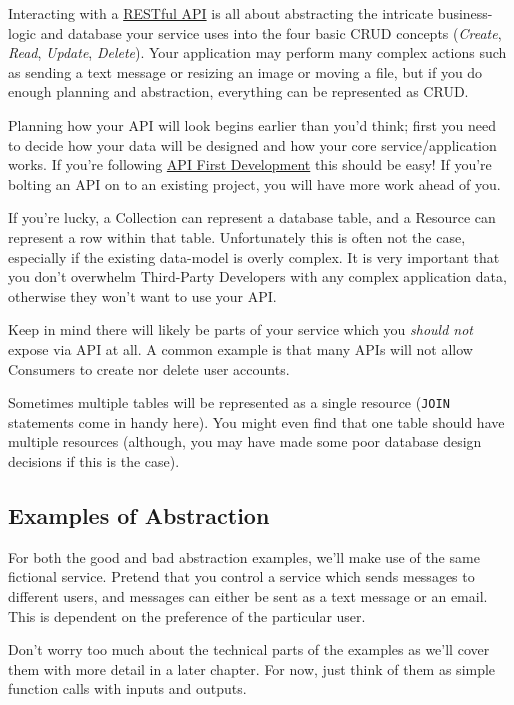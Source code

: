 \documentclass{book}
\begin{document}
Interacting with a \href{http://en.wikipedia.org/wiki/Restful}{RESTful API} is all about abstracting the intricate business-logic and database your service uses into the four basic CRUD concepts (\emph{Create}, \emph{Read}, \emph{Update}, \emph{Delete}). Your application may perform many complex actions such as sending a text message or resizing an image or moving a file, but if you do enough planning and abstraction, everything can be represented as CRUD.

Planning how your API will look begins earlier than you'd think; first you need to decide how your data will be designed and how your core service/application works. If you're following \href{http://blog.pop.co/post/67465239611/why-we-chose-api-first-development}{API First Development} this should be easy! If you're bolting an API on to an existing project, you will have more work ahead of you.

If you're lucky, a Collection can represent a database table, and a Resource can represent a row within that table. Unfortunately this is often not the case, especially if the existing data-model is overly complex. It is very important that you don't overwhelm Third-Party Developers with any complex application data, otherwise they won't want to use your API.

Keep in mind there will likely be parts of your service which you \emph{should not} expose via API at all. A common example is that many APIs will not allow Consumers to create nor delete user accounts.

Sometimes multiple tables will be represented as a single resource (\texttt{JOIN} statements come in handy here). You might even find that one table should have multiple resources (although, you may have made some poor database design decisions if this is the case).

\subsection{Examples of Abstraction}

For both the good and bad abstraction examples, we'll make use of the same fictional service. Pretend that you control a service which sends messages to different users, and messages can either be sent as a text message or an email. This is dependent on the preference of the particular user.

Don't worry too much about the technical parts of the examples as we'll cover them with more detail in a later chapter. For now, just think of them as simple function calls with inputs and outputs.
\end{document}
